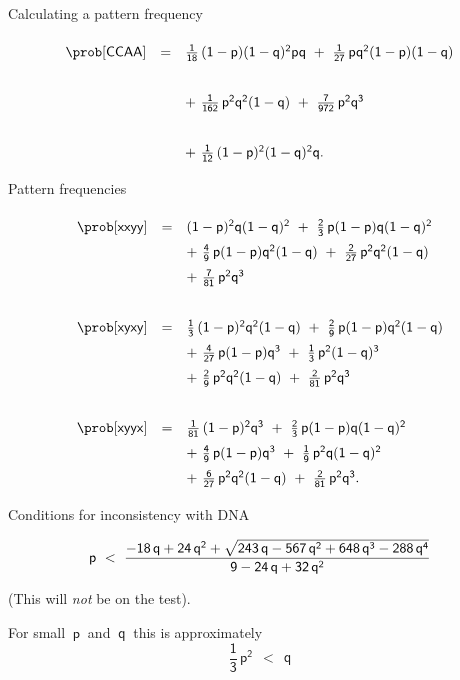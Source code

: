 \begin{slide}[Replace]{Calculating a pattern frequency}

\noindent
\[
\begin{array}{c c l}
\mathsf{\prob[CCAA]} & \mathsf{=} & \mathsf{\frac{1}{18}\,(1-p)(1-q)^2pq\ +\ \frac{1}{27}\,pq^2(1-p)(1-q)}\\
& & \\
& & \mathsf{+\ \frac{1}{162}\,p^2q^2(1-q)\ +\ \frac{7}{972}\,p^2q^3\ }\\
& & \\
& & \mathsf{+\ \frac{1}{12}\,(1-p)^2(1-q)^2q}.
\end{array}
\]

\end{slide}

\begin{slide}[Replace]{Pattern frequencies}

\noindent
\[
\renewcommand{\arraystretch}{1.5}
\begin{array}{c c l}
\mathsf{\prob[xxyy]} &  \mathsf{=} & \mathsf{(1-p)^2q(1-q)^2\ +\ \frac{2}{3}\,p(1-p)q(1-q)^2}\\
& &  \mathsf{+\ \frac{4}{9}\,p(1-p)q^2(1-q)\ +\ \frac{2}{27}\,p^2q^2(1-q)}\\
& &  \mathsf{+\ \frac{7}{81}\,p^2q^3}\\
& & \\
\mathsf{\prob[xyxy]} &  \mathsf{=} & \mathsf{\frac{1}{3}\,(1-p)^2q^2(1-q)\ +\ \frac{2}{9}\,p(1-p)q^2(1-q)}\\
& & \mathsf{+\ \frac{4}{27}\,p(1-p)q^3\ +\ \frac{1}{3}\,p^2(1-q)^3\ } \\
& & \mathsf{+\ \frac{2}{9}\,p^2q^2(1-q)\ +\ \frac{2}{81}\,p^2q^3}\\
& & \\
\mathsf{\prob[xyyx]} & \mathsf{=} &  \mathsf{\frac{1}{81}\,(1-p)^2q^3\ +\ \frac{2}{3}\,p(1-p)q(1-q)^2}\\
& & \mathsf{+\ \frac{4}{9}\,p(1-p)q^3\ +\ \frac{1}{9}\,p^2q(1-q)^2}\\
& & \mathsf{+\ \frac{6}{27}\,p^2q^2(1-q)\ +\ \frac{2}{81}\,p^2q^3}.
\end{array}
\]

\end{slide}

\begin{slide}[Replace]{Conditions for inconsistency with DNA}
{~~}
\vfill

\noindent
\[
\mathsf{p\ <\ {{-18\,q + 24\,{q^2} + {\sqrt{243\,q - 567\,{q^2} + 648\,{q^3} - 288\,{q^4}}}}\over {9 - 24\,q + 32\,{q^2}}}}
\]
\bigskip

(This will {\it not} be on the test).
\bigskip

For small $\mathsf{~p~}$ and $\mathsf{~q~}$ this is approximately
\[
\mathsf{\frac{1}{3}\,p^2 \ \ < \ \ q}
\]

\vfill

\vfill

\end{slide}

